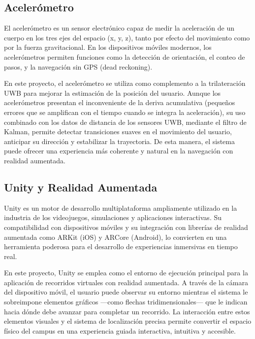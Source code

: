 \subsection{Acelerómetro}
{\justify El acelerómetro es un sensor electrónico capaz de medir la aceleración de un cuerpo en los tres ejes del espacio (x, y, z), tanto por efecto del movimiento como por la fuerza gravitacional. En los dispositivos móviles modernos, los acelerómetros permiten funciones como la detección de orientación, el conteo de pasos, y la navegación sin GPS (dead reckoning).

En este proyecto, el acelerómetro se utiliza como complemento a la trilateración UWB para mejorar la estimación de la posición del usuario. Aunque los acelerómetros presentan el inconveniente de la deriva acumulativa (pequeños errores que se amplifican con el tiempo cuando se integra la aceleración), su uso combinado con los datos de distancia de los sensores UWB, mediante el filtro de Kalman, permite detectar transiciones suaves en el movimiento del usuario, anticipar su dirección y estabilizar la trayectoria. De esta manera, el sistema puede ofrecer una experiencia más coherente y natural en la navegación con realidad aumentada.}

\subsection{Unity y Realidad Aumentada}
{\justify Unity es un motor de desarrollo multiplataforma ampliamente utilizado en la industria de los videojuegos, simulaciones y aplicaciones interactivas. Su compatibilidad con dispositivos móviles y su integración con librerías de realidad aumentada como ARKit (iOS) y ARCore (Android), lo convierten en una herramienta poderosa para el desarrollo de experiencias inmersivas en tiempo real.

En este proyecto, Unity se emplea como el entorno de ejecución principal para la aplicación de recorridos virtuales con realidad aumentada. A través de la cámara del dispositivo móvil, el usuario puede observar su entorno mientras el sistema le sobreimpone elementos gráficos —como flechas tridimensionales— que le indican hacia dónde debe avanzar para completar un recorrido. La interacción entre estos elementos visuales y el sistema de localización precisa permite convertir el espacio físico del campus en una experiencia guiada interactiva, intuitiva y accesible.}

